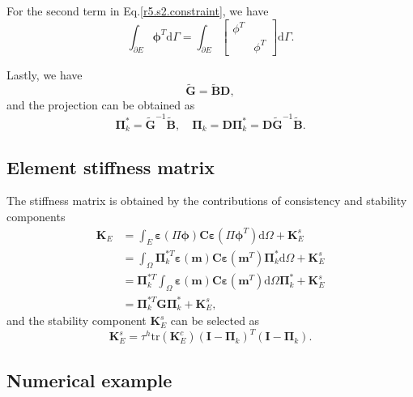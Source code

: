 \documentclass[kulak]{kulakarticle} %
\newcommand{\ud}{\mathrm{d}}
\begin{document}
For the second term in Eq.\eqref{r5.s2.constraint}, we have 
\begin{equation}
    \int_{\partial E}\bm{\phi}^T\ud\Gamma = 
    \int_{\partial E}
    \begin{bmatrix}
        \phi^T & \\ & \phi^T
    \end{bmatrix}
    \ud\Gamma.
\end{equation}

Lastly, we have 
\begin{equation}
    \tilde{\bm{G}} = \tilde{\bm{B}}\bm{D},
\end{equation}
and the projection can be obtained as 
\begin{equation}
    \bm{\Pi}_k^* = \tilde{\bm{G}}^{-1}\tilde{\bm{B}},\quad \bm{\Pi}_k = \bm{D}\bm{\Pi}_k^* = \bm{D}\tilde{\bm{G}}^{-1}\tilde{\bm{B}}.
\end{equation}


\subsection{Element stiffness matrix}
\label{r5.s2.2}
The stiffness matrix is obtained by the contributions of consistency and stability components
\begin{equation}
    \begin{aligned}
        \bm{K}_E &= \int_E\bm{\varepsilon}\left(\Pi\bm{\phi}\right)\bm{C}\bm{\varepsilon}\left(\Pi\bm{\phi}^T\right) \ud\Omega+\bm{K}_E^s\\
        &=\int_{\Omega}\bm{\Pi}^{*T}_k\bm{\varepsilon}(\bm{m})\bm{C}\bm{\varepsilon}\left(\bm{m}^T\right)\bm{\Pi}^*_k\ud\Omega+\bm{K}_E^s\\
        &=\bm{\Pi}^{*T}_k\int_{\Omega}\bm{\varepsilon}(\bm{m})\bm{C}\bm{\varepsilon}\left(\bm{m}^T\right)\ud\Omega\bm{\Pi}^*_k+\bm{K}_E^s\\
        &=\bm{\Pi}^{*T}_k\bm{G}\bm{\Pi}^*_k+\bm{K}_E^s,
    \end{aligned}
\end{equation}
and the stability component $\bm{K}_E^s$ can be selected as 
\begin{equation}
    \bm{K}_E^s = \tau^h\text{tr}\left(\bm{K}_E^c\right)\left(\bm{I}-\bm{\Pi}_k\right)^T\left(\bm{I}-\bm{\Pi}_k\right).
\end{equation}

\subsection{Numerical example}
\end{document}
